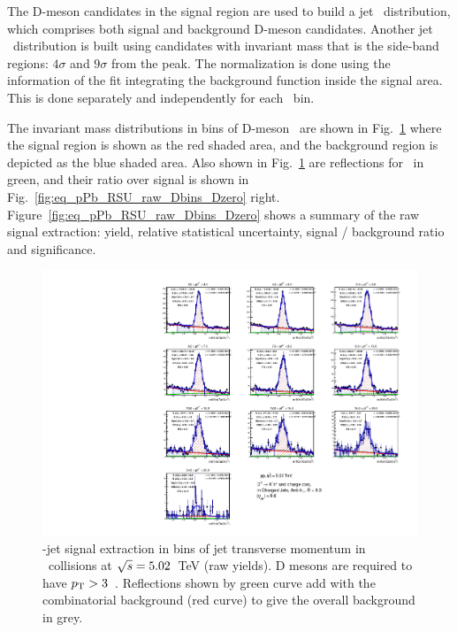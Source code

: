 The D-meson candidates in the signal region are used to build a jet \pt\ distribution, which comprises both signal and background D-meson candidates.
Another jet \pt\ distribution is built using candidates with invariant mass that is the side-band regions: $4\sigma$ and $9\sigma$ from the peak.
The normalization is done using the information of the fit integrating the background function inside the signal area. This is done separately and independently for each \ptd\ bin.


The invariant mass distributions in bins of D-meson \pt\ are shown in Fig.~\ref{fig:eq_pPb_InvMass_Dzero_Dbins} where  the signal region is shown as the red shaded area, and the background region is depicted as the blue shaded area.
Also shown in Fig.~\ref{fig:eq_pPb_InvMass_Dzero_Dbins} are reflections for \Dzero\ in green, and their ratio over signal is shown in Fig.~\ref{fig:eq_pPb_RSU_raw_Dbins_Dzero} right.
Figure~\ref{fig:eq_pPb_RSU_raw_Dbins_Dzero} shows a summary of the raw signal extraction:
yield, relative statistical uncertainty, signal / background ratio and significance.

\begin{figure}[bth]
\centering
\includegraphics[width=\textwidth]{pPbcuts_2sig/invMass_pTD3}
\caption{\Dzero-jet signal extraction in bins of jet transverse momentum in \pp\ collisions at $\sqrt{s}=5.02$~TeV (raw yields). D mesons are required to have $p_{\rm T}>3$~\GeVc. 
Reflections shown by green curve add with the combinatorial background (red curve) to give the overall background in grey.
}
\label{fig:eq_pPb_InvMass_Dzero_Dbins}
\end{figure}

